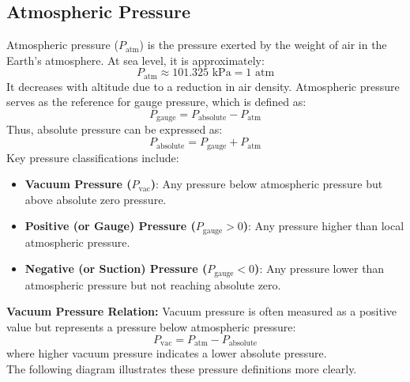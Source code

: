 \documentclass{article}
\begin{document}
\subsection{Atmospheric Pressure}
Atmospheric pressure ($P_{\text{atm}}$) is the pressure exerted by the weight of air in the Earth's atmosphere. At sea level, it is approximately:
\begin{equation}
	P_{\text{atm}} \approx 101.325 \text{ kPa} = 1 \text{ atm}
\end{equation}
It decreases with altitude due to a reduction in air density. Atmospheric pressure serves as the reference for gauge pressure, which is defined as:
\begin{equation}
	P_{\text{gauge}} = P_{\text{absolute}} - P_{\text{atm}}
\end{equation}
Thus, absolute pressure can be expressed as:
\begin{equation}
	P_{\text{absolute}} = P_{\text{gauge}} + P_{\text{atm}}
	\label{eq:absolute}
\end{equation}
Key pressure classifications include:\\
\vspace{-1em}
\begin{itemize}
	\item \textbf{Vacuum Pressure ($P_{\text{vac}}$)}: Any pressure below atmospheric pressure but above absolute zero pressure.
	\item \textbf{Positive (or Gauge) Pressure ($P_{\text{gauge}} > 0$)}: Any pressure higher than local atmospheric pressure.
	\item \textbf{Negative (or Suction) Pressure ($P_{\text{gauge}} < 0$)}: Any pressure lower than atmospheric pressure but not reaching absolute zero.
\end{itemize}\noindent
\textbf{Vacuum Pressure Relation:}  
Vacuum pressure is often measured as a positive value but represents a pressure below atmospheric pressure:
\begin{equation}
	P_{\text{vac}} = P_{\text{atm}} - P_{\text{absolute}}
\end{equation}
where higher vacuum pressure indicates a lower absolute pressure.\\[0.5em]
The following diagram illustrates these pressure definitions more clearly.\\\vspace{-1em}
\end{document}
